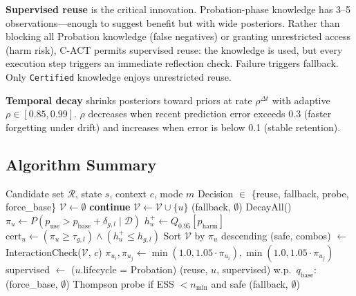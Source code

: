 \documentclass[letterpaper]{article}
\begin{document}
\textbf{Supervised reuse} is the critical innovation. Probation-phase knowledge has 3--5 observations---enough to suggest benefit but with wide posteriors. Rather than blocking all Probation knowledge (false negatives) or granting unrestricted access (harm risk), \textsc{C-ACT} permits supervised reuse: the knowledge is used, but every execution step triggers an immediate reflection check. Failure triggers fallback. Only \texttt{Certified} knowledge enjoys unrestricted reuse.

\textbf{Temporal decay} shrinks posteriors toward priors at rate $\rho^{\Delta t}$ with adaptive $\rho \in [0.85, 0.99]$. $\rho$ decreases when recent prediction error exceeds 0.3 (faster forgetting under drift) and increases when error is below 0.1 (stable retention).

\subsection{Algorithm Summary}

\begin{algorithm}[t]
\caption{\textsc{C-ACT} Admission Decision}
\label{alg:cact}
\begin{algorithmic}[1]
\REQUIRE Candidate set $\mathcal{R}$, state $s$, context $c$, mode $m$
\ENSURE Decision $\in$ \{reuse, fallback, probe, force\_base\}
\STATE $\mathcal{V} \gets \emptyset$
        \STATE \textbf{continue}
    \ENDIF
    \STATE $\mathcal{V} \gets \mathcal{V} \cup \{u\}$
\ENDFOR
{} \RETURN (fallback, $\emptyset$) \ENDIF
\STATE DecayAll()
    \STATE $\pi_u \gets P(p_{\text{use}} > p_{\text{base}} + \delta_{g,l} \mid \mathcal{D})$
    \STATE $h_u^+ \gets Q_{0.95}[p_{\text{harm}}]$
    \STATE $\text{cert}_u \gets (\pi_u \ge \tau_{g,l}) \land (h_u^+ \le h_{g,l})$
\ENDFOR
\STATE Sort $\mathcal{V}$ by $\pi_u$ descending
\STATE (safe, combos) $\gets$ InteractionCheck($\mathcal{V}$, $c$)
    \STATE $\pi_{u_i}, \pi_{u_j} \gets \min(1.0, 1.05\cdot\pi_{u_i}), \min(1.0, 1.05\cdot\pi_{u_j})$
\ENDFOR
{}
        \STATE supervised $\gets$ ($u$.lifecycle = Probation)
        \RETURN (reuse, $u$, supervised)
    \ENDIF
\ENDFOR
{}
    \STATE w.p.\ $q_{\text{base}}$: \RETURN (force\_base, $\emptyset$)
    \STATE Thompson probe if ESS $< n_{\min}$ and safe
\ENDIF
\RETURN (fallback, $\emptyset$)
\end{algorithmic}
\end{algorithm}
\end{document}

